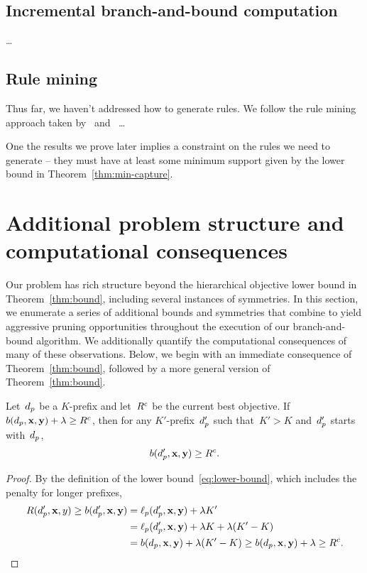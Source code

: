 \subsection{Incremental branch-and-bound computation}

\dots

\subsection{Rule mining}

Thus far, we haven't addressed how to generate rules.
%
We follow the rule mining approach taken by~\citet{LethamRuMcMa15}
and~\citet{YangRuSe16} \dots

One the results we prove later implies a constraint on the rules
we need to generate -- they must have at least some minimum support
given by the lower bound in Theorem~\ref{thm:min-capture}.

\section{Additional problem structure and computational consequences}

Our problem has rich structure beyond the hierarchical objective lower bound
in Theorem~\ref{thm:bound}, including several instances of symmetries.
%
In this section, we enumerate a series of additional bounds and
symmetries that combine to yield aggressive pruning opportunities
throughout the execution of our branch-and-bound algorithm.
%
We additionally quantify the computational consequences of many
of these observations.
%
Below, we begin with an immediate consequence of Theorem~\ref{thm:bound},
followed by a more general version of Theorem~\ref{thm:bound}.

\begin{lemma}
Let~$d_p$ be a $K$-prefix
and let~${R^c}$ be the current best objective.
%
If ${b(d_p, \mathbf{x}, \mathbf{y}) + {\lambda} \ge {R^c}}$,
then for any $K'$-prefix~$d_p'$ such that~${K' > K}$
and~$d_p'$ starts with~$d_p$,
\begin{align}
 b(\Prefix', \x, \y) \ge \CurrentObj.
\label{eq:lookahead}
\end{align}
\end{lemma}

\begin{proof}
By the definition of the lower bound~\eqref{eq:lower-bound},
which includes the penalty for longer prefixes,
\begin{align}
\Obj(\Prefix', \x, y) \ge b(\Prefix', \x, \y) &= \Loss_p(\Prefix', \x, \y) + \Reg K' \nn \\
&= \Loss_p(\Prefix', \x, \y) + \Reg K + \Reg (K' - K) \nn \\
&= b(\Prefix, \x, \y) + \Reg (K' - K)
\ge b(\Prefix, \x, \y) + \Reg \ge \CurrentObj.
\end{align}
\end{proof}

